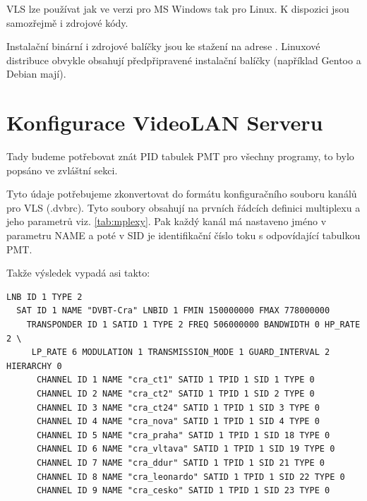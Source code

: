 VLS lze používat jak ve verzi pro MS Windows tak pro Linux. K dispozici jsou samozřejmě i zdrojové kódy.

\vspace{10pt}

Instalační binární i zdrojové balíčky jsou ke stažení na adrese \cite{videolanURL}.
Linuxové distribuce obvykle obsahují předpřipravené instalační balíčky (například Gentoo a Debian mají). 

\vspace{10pt}

\section{Konfigurace VideoLAN Serveru}
\vspace{10pt}

Tady budeme potřebovat znát PID tabulek PMT pro všechny programy, to bylo popsáno ve zvláštní sekci.

Tyto údaje potřebujeme zkonvertovat do formátu konfiguračního souboru kanálů pro VLS (.dvbrc). Tyto soubory obsahují na prvních řádcích definici multiplexu a jeho parametrů viz. \ref{tab:mplexy}. Pak každý kanál má nastaveno jméno v parametru NAME a poté v SID je identifikační číslo toku s odpovídající tabulkou PMT.

Takže výsledek vypadá asi takto:

\vspace{10pt}

\begin{small}
\begin{verbatim}
LNB ID 1 TYPE 2
  SAT ID 1 NAME "DVBT-Cra" LNBID 1 FMIN 150000000 FMAX 778000000
    TRANSPONDER ID 1 SATID 1 TYPE 2 FREQ 506000000 BANDWIDTH 0 HP_RATE 2 \
     LP_RATE 6 MODULATION 1 TRANSMISSION_MODE 1 GUARD_INTERVAL 2 HIERARCHY 0
      CHANNEL ID 1 NAME "cra_ct1" SATID 1 TPID 1 SID 1 TYPE 0
      CHANNEL ID 2 NAME "cra_ct2" SATID 1 TPID 1 SID 2 TYPE 0
      CHANNEL ID 3 NAME "cra_ct24" SATID 1 TPID 1 SID 3 TYPE 0
      CHANNEL ID 4 NAME "cra_nova" SATID 1 TPID 1 SID 4 TYPE 0
      CHANNEL ID 5 NAME "cra_praha" SATID 1 TPID 1 SID 18 TYPE 0
      CHANNEL ID 6 NAME "cra_vltava" SATID 1 TPID 1 SID 19 TYPE 0
      CHANNEL ID 7 NAME "cra_ddur" SATID 1 TPID 1 SID 21 TYPE 0
      CHANNEL ID 8 NAME "cra_leonardo" SATID 1 TPID 1 SID 22 TYPE 0
      CHANNEL ID 9 NAME "cra_cesko" SATID 1 TPID 1 SID 23 TYPE 0
\end{verbatim}
\end{small}

